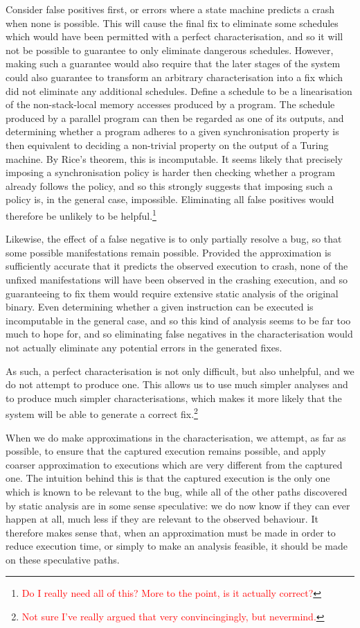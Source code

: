 \documentclass[10pt,twocolumn,preprint,natbib,authoryear]{sigplanconf}
\newcommand{\editorial}[1]{\textcolor{red}{\footnote{\textcolor{red}{#1}}}}
\begin{document}
Consider false positives first, or errors where a state machine
predicts a crash when none is possible.  This will cause the final fix
to eliminate some schedules which would have been permitted with a
perfect characterisation, and so it will not be possible to guarantee
to only eliminate dangerous schedules.  However, making such a
guarantee would also require that the later stages of the system could
also guarantee to transform an arbitrary characterisation into a fix
which did not eliminate any additional schedules.  Define a schedule
to be a linearisation of the non-stack-local memory accesses produced
by a program.  The schedule produced by a parallel program can then be
regarded as one of its outputs, and determining whether a program
adheres to a given synchronisation property is then equivalent to
deciding a non-trivial property on the output of a Turing machine.  By
Rice's theorem, this is incomputable.  It seems likely that precisely
imposing a synchronisation policy is harder then checking whether a
program already follows the policy, and so this strongly suggests that
imposing such a policy is, in the general case, impossible.
Eliminating all false positives would therefore be unlikely to be
helpful.\editorial{Do I really need all of this?  More to the point,
  is it actually correct?}

Likewise, the effect of a false negative is to only partially resolve
a bug, so that some possible manifestations remain possible.  Provided
the approximation is sufficiently accurate that it predicts the
observed execution to crash, none of the unfixed manifestations will
have been observed in the crashing execution, and so guaranteeing to
fix them would require extensive static analysis of the original
binary.  Even determining whether a given instruction can be executed
is incomputable in the general case, and so this kind of analysis
seems to be far too much to hope for, and so eliminating false
negatives in the characterisation would not actually eliminate any
potential errors in the generated fixes.

As such, a perfect characterisation is not only difficult, but also
unhelpful, and we do not attempt to produce one.  This allows us to
use much simpler analyses and to produce much simpler
characterisations, which makes it more likely that the system will be
able to generate a correct fix.\editorial{Not sure I've really argued
  that very convincingingly, but nevermind.}

When we do make approximations in the characterisation, we attempt, as
far as possible, to ensure that the captured execution remains
possible, and apply coarser approximation to executions which are very
different from the captured one.  The intuition behind this is that
the captured execution is the only one which is known to be relevant
to the bug, while all of the other paths discovered by static analysis
are in some sense speculative: we do now know if they can ever happen
at all, much less if they are relevant to the observed behaviour.  It
therefore makes sense that, when an approximation must be made in
order to reduce execution time, or simply to make an analysis
feasible, it should be made on these speculative paths.
\end{document}
